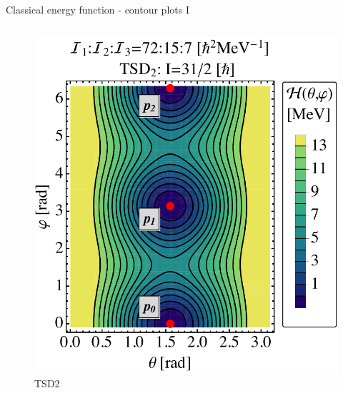 \documentclass{beamer}
\begin{document}
\begin{frame}{Classical energy function - contour plots I}
\begin{columns}
\begin{figure}
    \includegraphics[scale=0.3]{figs/contour2_optimal.pdf}
    \caption{TSD2}
\end{figure}
\end{columns}
\end{frame}
\end{document}
